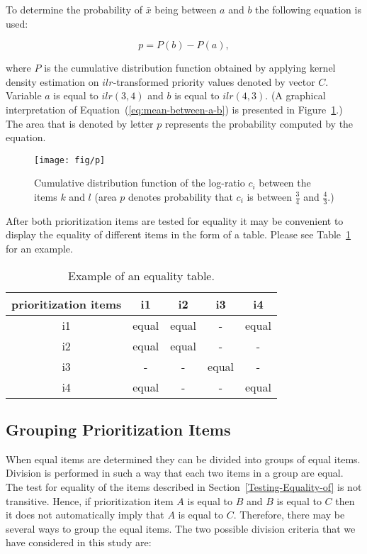 To determine the probability of $\bar{x}$ being between $a$ and $b$ the following equation is used:

\begin{equation}
	p=P(b)-P(a)\label{eq:mean-between-a-b},
\end{equation}

where $P$ is the cumulative distribution function obtained by applying kernel density estimation on $ilr$-transformed priority values denoted by vector $C$. Variable $a$ is equal to $ilr(3,4)$ and $b$ is equal to $ilr(4,3)$. (A graphical interpretation of Equation~(\ref{eq:mean-between-a-b}) is presented in Figure~\ref{fig:Probability-p-that}.)
The area that is denoted by letter $p$ represents the probability computed by the equation.

\begin{figure}
	\center
\texttt{[image: fig/p]}
\caption{
	\label{fig:Probability-p-that}
	Cumulative distribution function of the log-ratio $c_{i}$ between the items $k$ and $l$ (area $p$ denotes probability that $c_{i}$ is between $\frac{3}{4}$ and $\frac{4}{3}$.)
}
\end{figure}

After both prioritization items are tested for equality it may
be convenient to display the equality of different items in the form of a table.
Please see Table~\ref{tab:ECVexample} for an example.

\begin{table}
	\scriptsize
	\centering
\caption{Example of an equality table.}

\label{tab:ECVexample}
\begin{tabular}{|c|c|c|c|c|}
\hline 
prioritization items & i1 & i2 & i3 & i4\tabularnewline
\hline\hline 
i1 & equal & equal & - & equal\tabularnewline
\hline 
i2 & equal & equal & - & -\tabularnewline
\hline 
i3 & - & - & equal & -\tabularnewline
\hline 
i4 & equal & - & - & equal\tabularnewline
\hline
\end{tabular}
\end{table}

\subsection{Grouping Prioritization Items}
When equal items are determined they can be divided into groups of equal items. Division is performed in such a way that each two items in a group are equal. The test for equality of the items described in Section~\ref{Testing-Equality-of} is not transitive. Hence, if prioritization item $A$ is equal to $B$ and $B$ is equal to $C$ then it does not automatically imply that $A$ is equal to $C$. Therefore, there may be several ways to group the equal items. The two possible division criteria that we have considered in this study are:

